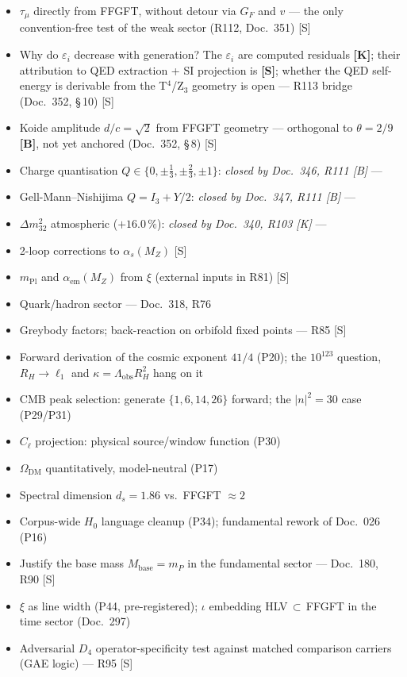 \begin{itemize}\itemsep2pt
  \item $\tau_\mu$ directly from FFGFT, without detour via $G_F$ and $v$ --- the only convention-free test of the weak sector (R112, Doc.~351) [S]
  \item Why do $\varepsilon_i$ decrease with generation? The $\varepsilon_i$ are computed residuals \textbf{[K]}; their attribution to QED extraction + SI projection is \textbf{[S]}; whether the QED self-energy is derivable from the T$^4$/Z$_3$ geometry is open --- R113 bridge (Doc.~352, §\,10) [S]
  \item Koide amplitude $d/c=\sqrt{2}$ from FFGFT geometry --- orthogonal to $\theta=2/9$ \textbf{[B]}, not yet anchored (Doc.~352, §\,8) [S]
  \item Charge quantisation $Q\in\{0,\pm\tfrac{1}{3},\pm\tfrac{2}{3},\pm1\}$: \emph{closed by Doc.~346, R111 [B]} ---
  \item Gell-Mann--Nishijima $Q=I_3+Y/2$: \emph{closed by Doc.~347, R111 [B]} ---
  \item $\Delta m_{32}^2$ atmospheric ($+16.0\,\%$): \emph{closed by Doc.~340, R103 [K]} ---
  \item 2-loop corrections to $\alpha_s(M_Z)$ [S]
  \item $m_{\mathrm{Pl}}$ and $\alpha_{\mathrm{em}}(M_Z)$ from $\xi$ (external inputs in R81) [S]
  \item Quark/hadron sector --- Doc.~318, R76
  \item Greybody factors; back-reaction on orbifold fixed points --- R85 [S]
  \item Forward derivation of the cosmic exponent $41/4$ (P20); the $10^{123}$ question, $R_H\to\ell_1$ and $\kappa = \Lambda_{\mathrm{obs}}R_H^2$ hang on it
  \item CMB peak selection: generate $\{1,6,14,26\}$ forward; the $|n|^2{=}30$ case (P29/P31)
  \item $C_\ell$ projection: physical source/window function (P30)
  \item $\Omega_{\mathrm{DM}}$ quantitatively, model-neutral (P17)
  \item Spectral dimension $d_s = 1.86$ vs.\ FFGFT $\approx 2$
  \item Corpus-wide $H_0$ language cleanup (P34); fundamental rework of Doc.~026 (P16)
  \item Justify the base mass $M_\mathrm{base} = m_P$ in the fundamental sector --- Doc.~180, R90 [S]
  \item $\xi$ as line width (P44, pre-registered); $\iota$ embedding HLV$\,\subset\,$FFGFT in the time sector (Doc.~297)
  \item Adversarial $D_4$ operator-specificity test against matched comparison carriers (GAE logic) --- R95 [S]
\end{itemize}
